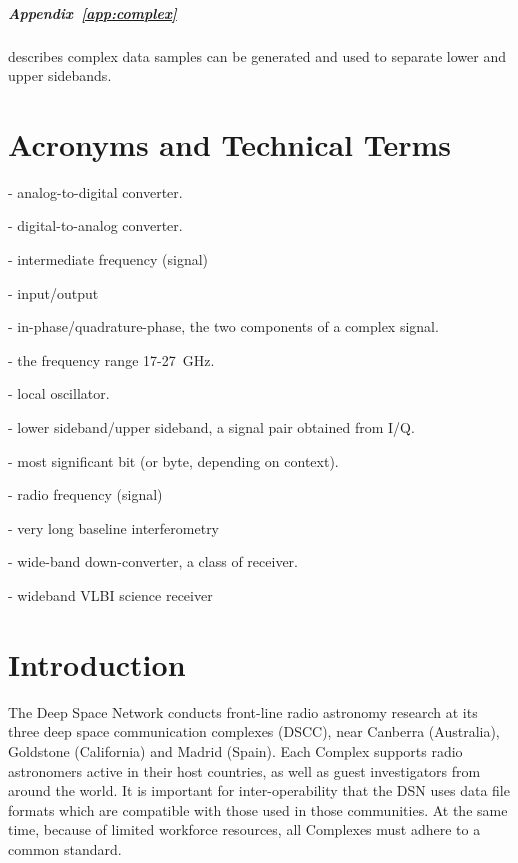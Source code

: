 \documentclass[letterpaper,11pt]{book}
\begin{document}
\paragraph{Appendix~\ref{app:complex}} describes complex data samples can be
generated and used to separate lower and upper sidebands.

\tableofcontents
\listoffigures
{}

\chapter*{Acronyms and Technical Terms}

\begin{description}\itemsep0pt \parskip0pt 
  \item[ADC]- analog-to-digital converter.
  \item[DAC]- digital-to-analog converter.
  \item[IF]- intermediate frequency (signal) 
  \item[I/O]- input/output
  \item[I/Q]- in-phase/quadrature-phase, the two components of a complex signal.
  \item[K-band]- the frequency range 17-27~GHz.
  \item[LO]- local oscillator.
  \item[L/U]- lower sideband/upper sideband, a signal pair obtained from I/Q.
  \item[MSB]- most significant bit (or byte, depending on context).
  \item[RF]- radio frequency (signal)
  \item[VLBI]- very long baseline interferometry
  \item[WBDC]- wide-band down-converter, a class of receiver.
  \item[WVSR]- wideband VLBI science receiver
\end{description}

\mainmatter

\chapter{Introduction}\label{chap:intro}

The Deep Space Network conducts front-line radio astronomy research at its
three deep space communication complexes (DSCC), near Canberra (Australia),
Goldstone (California) and Madrid
(Spain).  Each Complex supports radio astronomers active in their host
countries, as well as guest investigators from around the world.  It is
important for inter-operability that the DSN uses data file formats which are
compatible with those used in those communities.  At the same time, because of
limited workforce resources, all Complexes must adhere to a common standard.
\end{document}
